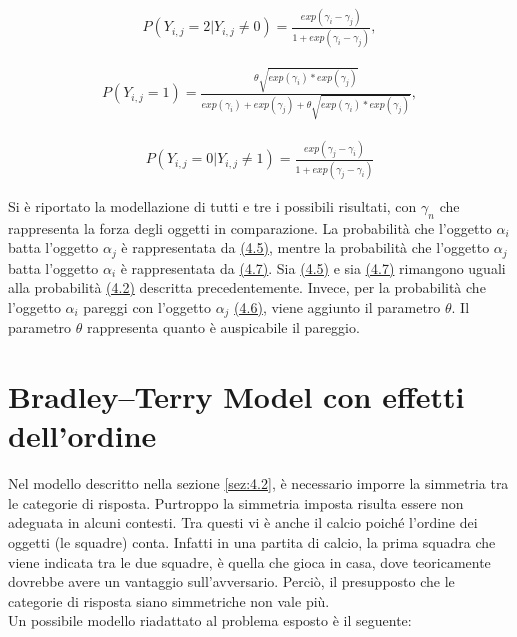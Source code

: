 \begin{align}
	P(Y_{i,j} = 2 | Y_{i,j} \not = 0) =  \frac{exp(\gamma_{i} - \gamma_{j})}{1 + exp(\gamma_{i} - \gamma_{j})}, \label{for:4.5}
\end{align}
	
\begin{align}
	P(Y_{i,j} = 1) =  \frac{\theta \sqrt{exp(\gamma_{i}) * exp(\gamma_{j})}}{exp(\gamma_{i}) + exp(\gamma_{j}) + \theta\sqrt{exp(\gamma_{i}) * exp(\gamma_{j})}}, \label{for:4.6}
\end{align}

\begin{align}	
	P(Y_{i,j} = 0 | Y_{i,j} \not = 1) =  \frac{exp(\gamma_{j} - \gamma_{i})}{1 + exp(\gamma_{j} - \gamma_{i})}\label{for:4.7}
\end{align}

Si è riportato la modellazione di tutti e tre i possibili risultati, con $\gamma_{n}$ che rappresenta la forza degli oggetti in comparazione. La probabilità che l'oggetto $\alpha_{i}$ batta l'oggetto $\alpha_{j}$ è rappresentata da \hyperref[for:4.5]{(4.5)}, mentre la probabilità che l'oggetto $\alpha_{j}$ batta l'oggetto $\alpha_{i}$ è rappresentata da  \hyperref[for:4.7]{(4.7)}. Sia \hyperref[for:4.5]{(4.5)} e sia \hyperref[for:4.7]{(4.7)} rimangono uguali alla probabilità \hyperref[for:3.1]{(4.2)} descritta precedentemente. Invece, per la probabilità che l'oggetto $\alpha_{i}$ pareggi con l'oggetto $\alpha_{j}$ \hyperref[for:4.6]{(4.6)}, viene aggiunto il parametro $\theta$. Il parametro $\theta$ rappresenta quanto è auspicabile il pareggio. \\

\section{Bradley–Terry Model con effetti dell'ordine} \label{sez:4.3}
Nel modello descritto nella sezione \ref{sez:4.2}, è necessario imporre la simmetria tra le categorie di risposta. Purtroppo la simmetria imposta risulta essere non adeguata in alcuni contesti. Tra questi vi è anche il calcio poiché l'ordine dei oggetti (le squadre) conta. Infatti in una partita di calcio, la prima squadra che viene indicata tra le due squadre, è quella che gioca in casa, dove teoricamente dovrebbe avere un vantaggio sull'avversario. Perciò, il presupposto che le categorie di risposta siano simmetriche non vale più. \\
Un possibile modello riadattato al problema esposto è il seguente:

